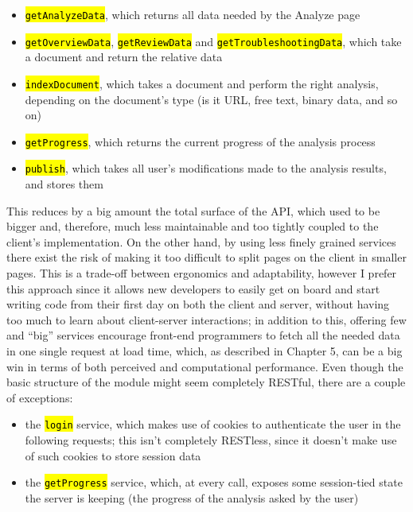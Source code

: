 \documentclass[12pt,oneside,svgnames]{memoir}
\let\OldTexttt\texttt
\renewcommand{\texttt}[1]{\OldTexttt{\hl{#1}}}
\begin{document}
\begin{itemize}
\itemsep1pt\parskip0pt
\item
  \texttt{getAnalyzeData}, which returns all data needed by the Analyze
  page
\item
  \texttt{getOverviewData}, \texttt{getReviewData} and
  \texttt{getTroubleshootingData}, which take a document and return the
  relative data
\item
  \texttt{indexDocument}, which takes a document and perform the right
  analysis, depending on the document's type (is it URL, free text,
  binary data, and so on)
\item
  \texttt{getProgress}, which returns the current progress of the
  analysis process
\item
  \texttt{publish}, which takes all user's modifications made to the
  analysis results, and stores them
\end{itemize}

This reduces by a big amount the total surface of the API, which used to
be bigger and, therefore, much less maintainable and too tightly coupled
to the client's implementation. On the other hand, by using less finely
grained services there exist the risk of making it too difficult to
split pages on the client in smaller pages. This is a trade-off between
ergonomics and adaptability, however I prefer this approach since it
allows new developers to easily get on board and start writing code from
their first day on both the client and server, without having too much
to learn about client-server interactions; in addition to this, offering
few and ``big'' services encourage front-end programmers to fetch all
the needed data in one single request at load time, which, as described
in Chapter 5, can be a big win in terms of both perceived and
computational performance. Even though the basic structure of the module
might seem completely RESTful, there are a couple of exceptions:

\begin{itemize}
\itemsep1pt\parskip0pt
\item
  the \texttt{login} service, which makes use of cookies to authenticate
  the user in the following requests; this isn't completely RESTless,
  since it doesn't make use of such cookies to store session data
\item
  the \texttt{getProgress} service, which, at every call, exposes some
  session-tied state the server is keeping (the progress of the analysis
  asked by the user)
\end{itemize}
\end{document}
